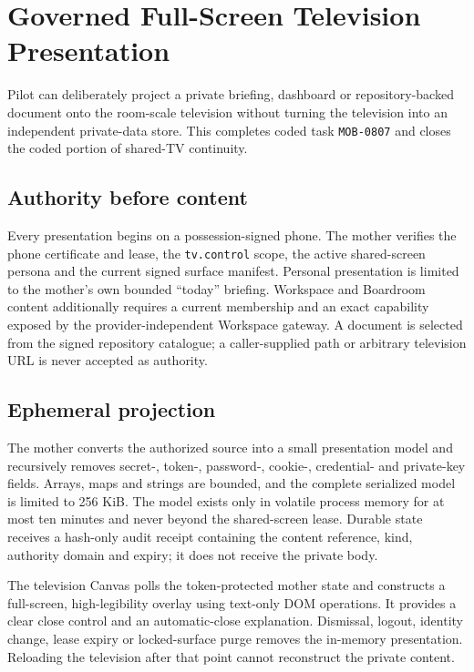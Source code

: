 \section{Governed Full-Screen Television Presentation}
\label{sec:pilot-mobile-governed-tv-presentation}

Pilot can deliberately project a private briefing, dashboard or repository-backed
document onto the room-scale television without turning the television into an
independent private-data store.  This completes coded task \texttt{MOB-0807} and
closes the coded portion of shared-TV continuity.

\subsection{Authority before content}

Every presentation begins on a possession-signed phone.  The mother verifies the
phone certificate and lease, the \texttt{tv.control} scope, the active shared-screen
persona and the current signed surface manifest.  Personal presentation is limited
to the mother's own bounded ``today'' briefing.  Workspace and Boardroom content
additionally requires a current membership and an exact capability exposed by the
provider-independent Workspace gateway.  A document is selected from the signed
repository catalogue; a caller-supplied path or arbitrary television URL is never
accepted as authority.

\subsection{Ephemeral projection}

The mother converts the authorized source into a small presentation model and
recursively removes secret-, token-, password-, cookie-, credential- and private-key
fields.  Arrays, maps and strings are bounded, and the complete serialized model is
limited to 256 KiB.  The model exists only in volatile process memory for at most ten
minutes and never beyond the shared-screen lease.  Durable state receives a hash-only
audit receipt containing the content reference, kind, authority domain and expiry;
it does not receive the private body.

The television Canvas polls the token-protected mother state and constructs a
full-screen, high-legibility overlay using text-only DOM operations.  It provides a
clear close control and an automatic-close explanation.  Dismissal, logout, identity
change, lease expiry or locked-surface purge removes the in-memory presentation.
Reloading the television after that point cannot reconstruct the private content.

